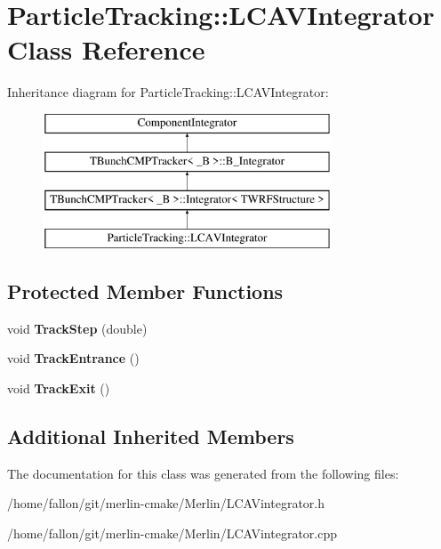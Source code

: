 \hypertarget{classParticleTracking_1_1LCAVIntegrator}{}\section{Particle\+Tracking\+:\+:L\+C\+A\+V\+Integrator Class Reference}
\label{classParticleTracking_1_1LCAVIntegrator}
Inheritance diagram for Particle\+Tracking\+:\+:L\+C\+A\+V\+Integrator\+:\begin{figure}[H]
\begin{center}
\leavevmode
\includegraphics[height=4.000000cm]{classParticleTracking_1_1LCAVIntegrator}
\end{center}
\end{figure}
\subsection*{Protected Member Functions}
\begin{DoxyCompactItemize}
\item 
\mbox{\label{classParticleTracking_1_1LCAVIntegrator_a4a393fda9f3531ccd9769b176b986a6a}} 
void {\bfseries Track\+Step} (double)
\item 
\mbox{\label{classParticleTracking_1_1LCAVIntegrator_aafc19c2525e1338f2554ee67aa7b0498}} 
void {\bfseries Track\+Entrance} ()
\item 
\mbox{\label{classParticleTracking_1_1LCAVIntegrator_a1ec416aa0f787588f179ab2da01e0817}} 
void {\bfseries Track\+Exit} ()
\end{DoxyCompactItemize}
\subsection*{Additional Inherited Members}


The documentation for this class was generated from the following files\+:\begin{DoxyCompactItemize}
\item 
/home/fallon/git/merlin-\/cmake/\+Merlin/L\+C\+A\+Vintegrator.\+h\item 
/home/fallon/git/merlin-\/cmake/\+Merlin/L\+C\+A\+Vintegrator.\+cpp\end{DoxyCompactItemize}
